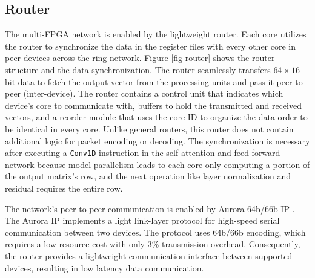 \subsection{Router} \label{microarchitecture_router}
The multi-FPGA network is enabled by the lightweight router. Each core utilizes the router to synchronize the data in the register files with every other core in peer devices across the ring network. Figure \ref{fig-router} shows the router structure and the data synchronization. The router seamlessly transfers $64 \times 16 $ bit data to fetch the output vector from the processing units and pass it peer-to-peer (inter-device). The router contains a control unit that indicates which device's core to communicate with, buffers to hold the transmitted and received vectors, and a reorder module that uses the core ID to organize the data order to be identical in every core. Unlike general routers, this router does not contain additional logic for packet encoding or decoding. The synchronization is necessary after executing a \texttt{Conv1D} instruction in the self-attention and feed-forward network because model parallelism leads to each core only computing a portion of the output matrix's row, and the next operation like layer normalization and residual requires the entire row. 

The network's peer-to-peer communication is enabled by Aurora 64b/66b IP \cite{aurora}. The Aurora IP implements a light link-layer protocol for high-speed serial communication between two devices. The protocol uses 64b/66b encoding, which requires a low resource cost with only 3\% transmission overhead. Consequently, the router provides a lightweight communication interface between supported devices, resulting in low latency data communication.

